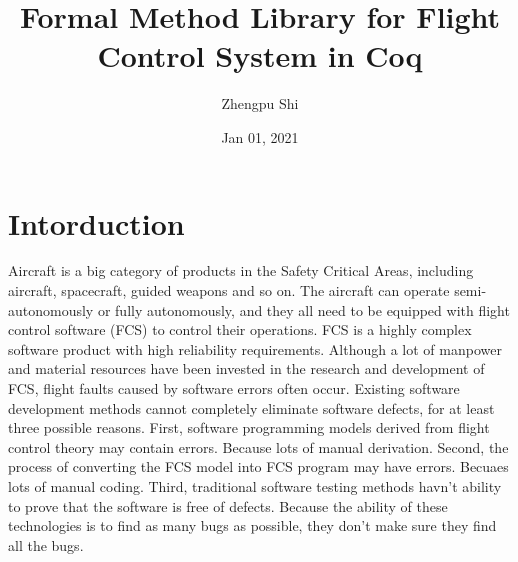 \documentclass{article} %
\title{Formal Method Library for Flight Control System in Coq}
\author{Zhengpu Shi}
\affil{Draft V1.0}
\date{Jan 01, 2021} %
\numberwithin{equation}{section} %
\begin{document}
\maketitle







\section{Intorduction}
Aircraft is a big category of products in the Safety Critical Areas, including aircraft, spacecraft, guided weapons and so on.
The aircraft can operate semi-autonomously or fully autonomously, and they all need to be equipped with flight control software (FCS) to control their operations.
FCS is a highly complex software product with high reliability requirements.
Although a lot of manpower and material resources have been invested in the research and development of FCS, flight faults caused by software errors often occur.
Existing software development methods cannot completely eliminate software defects, for at least three possible reasons.
First, software programming models derived from flight control theory may contain errors.
Because lots of manual derivation.
Second, the process of converting the FCS model into FCS program may have errors.
Becuaes lots of manual coding.
Third, traditional software testing methods havn't ability to prove that the software is free of defects.
Because the ability of these technologies is to find as many bugs as possible, they don't make sure they find all the bugs.
\end{document}
